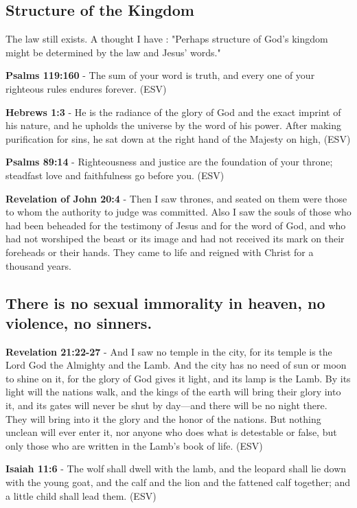 \documentclass[11pt]{article}
\begin{document}
\subsection{Structure of the Kingdom}
\label{sec:org918377b}

The law still exists. A thought I have : "Perhaps structure of God's kingdom might be determined by the law and Jesus' words."

\textbf{Psalms 119:160} - The sum of your word is truth, and every one of your righteous rules endures forever. (ESV)

\textbf{Hebrews 1:3} - He is the radiance of the glory of God and the exact imprint of his nature, and he upholds the universe by the word of his power. After making purification for sins, he sat down at the right hand of the Majesty on high, (ESV)

\textbf{Psalms 89:14} - Righteousness and justice are the foundation of your throne; steadfast love and faithfulness go before you. (ESV)

\textbf{Revelation of John 20:4} - Then I saw thrones, and seated on them were those to whom the authority to judge was committed. Also I saw the souls of those who had been beheaded for the testimony of Jesus and for the word of God, and who had not worshiped the beast or its image and had not received its mark on their foreheads or their hands. They came to life and reigned with Christ for a thousand years.

\subsection{There is no sexual immorality in heaven, no violence, no sinners.}
\label{sec:org83971a7}

\textbf{Revelation 21:22-27} - And I saw no temple in the city, for its temple is the Lord God the Almighty and the Lamb. And the city has no need of sun or moon to shine on it, for the glory of God gives it light, and its lamp is the Lamb. By its light will the nations walk, and the kings of the earth will bring their glory into it, and its gates will never be shut by day—and there will be no night there. They will bring into it the glory and the honor of the nations. But nothing unclean will ever enter it, nor anyone who does what is detestable or false, but only those who are written in the Lamb's book of life. (ESV)

\textbf{Isaiah 11:6} - The wolf shall dwell with the lamb, and the leopard shall lie down with the young goat, and the calf and the lion and the fattened calf together; and a little child shall lead them. (ESV)
\end{document}
